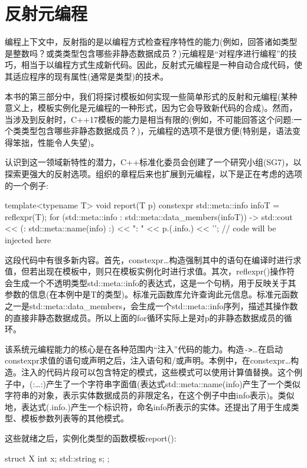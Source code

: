 \section{反射元编程}
编程上下文中，反射指的是以编程方式检查程序特性的能力(例如，回答诸如类型是整数吗？或类类型包含哪些非静态数据成员？)元编程是“对程序进行编程”的技巧，相当于以编程方式生成新代码。因此，反射式元编程是一种自动合成代码，使其适应程序的现有属性(通常是类型)的技术。

本书的第三部分中，我们将探讨模板如何实现一些简单形式的反射和元编程(某种意义上，模板实例化是元编程的一种形式，因为它会导致新代码的合成)。然而，当涉及到反射时，C++17模板的能力是相当有限的(例如，不可能回答这个问题:一个类类型包含哪些非静态数据成员？)，元编程的选项不是很方便(特别是，语法变得笨拙，性能令人失望)。

认识到这一领域新特性的潜力，C++标准化委员会创建了一个研究小组(SG7)，以探索更强大的反射选项。组织的章程后来也扩展到元编程，以下是正在考虑的选项的一个例子:

\begin{cpp}
template<typename T> void report(T p) {
	constexpr {
		std::meta::info infoT = reflexpr(T);
		for (std::meta::info : std::meta::data_members(infoT)) {
			-> {
				std::cout << (: std::meta::name(info) :)
				<< ": " << p.(.info.) << ’\n’;
			}
		}
	}
	// code will be injected here
}
\end{cpp}

这段代码中有很多新内容。首先，constexpr{…}构造强制其中的语句在编译时进行求值，但若出现在模板中，则只在模板实例化时进行求值。其次，reflexpr()操作符会生成一个不透明类型std::meta::info的表达式，这是一个句柄，用于反映关于其参数的信息(在本例中是T的类型)。标准元函数库允许查询此元信息。标准元函数之一是std::meta::data\_members，会生成一个std::meta::info序列，描述其操作数的直接非静态数据成员。所以上面的for循环实际上是对p的非静态数据成员的循环。

该系统元编程能力的核心是在各种范围内“注入”代码的能力。构造\texttt{->}{…}在启动constexpr求值的语句或声明之后，注入语句和/或声明。本例中，在constexpr{…}构造。注入的代码片段可以包含特定的模式，这些模式可以使用计算值替换。这个例子中，(:…:)产生了一个字符串字面值(表达式std::meta::name(info)产生了一个类似字符串的对象，表示实体数据成员的非限定名，在这个例子中由info表示)。类似地，表达式(.info.)产生一个标识符，命名info所表示的实体。还提出了用于生成类型、模板参数列表等的其他模式。

这些就绪之后，实例化类型的函数模板report():

\begin{cpp}
struct X {
	int x;
	std::string s;
};
\end{cpp}

